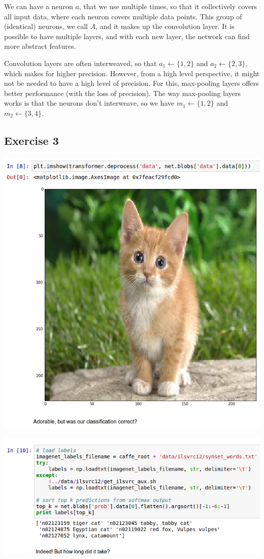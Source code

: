 \documentclass{article}
\begin{document}
We can have a neuron $a$, that we use multiple times, so that it collectively covers all input data, where each neuron covers multiple data points. This group of (identical) neurons, we call $A$, and it makes up the convolution layer. It is possible to have multiple layers, and with each new layer, the network can find more abstract features.

Convolution layers are often interweaved, so that $a_1 \leftarrow \{1, 2\}$ and $a_2 \leftarrow \{2, 3\}$, which makes for higher precision. However, from a high level perspective, it might not be needed to have a high level of precision. For this, max-pooling layers offers better performance (with the loss of precision). The way max-pooling layers works is that the neurons don't interweave, so we have $m_1 \leftarrow \{1, 2\}$ and $m_2 \leftarrow \{3, 4\}$.


\subsection{Exercise 3}

\includegraphics[scale=0.5]{cat.png}

\includegraphics[scale=0.5]{cat2.png}
\end{document}

